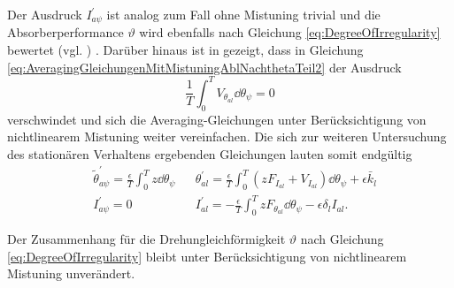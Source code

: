 Der Ausdruck $I_{a \psi}^\prime$ ist analog zum Fall ohne Mistuning trivial und
die Absorberperformance $\vartheta$ wird ebenfalls nach Gleichung \eqref{eq:DegreeOfIrregularity} 
bewertet (vgl. ) \cite{Mayet:CPVAMitMistuning}.
Darüber hinaus ist in %
\cite{Mayet:CPVAMitMistuning}
gezeigt, dass in Gleichung \eqref{eq:AveragingGleichungenMitMistuningAblNachthetaTeil2} der Ausdruck
%
\begin{equation}
	 \frac{1}{T} \int_0^T    V_{\theta_{al}}   \dd \theta_{\psi} = 0		
	\label{eq:TermTildeVwelcherVerschwindet}
\end{equation}
verschwindet und sich die Averaging-Gleichungen unter Berücksichtigung von nichtlinearem Mistuning 
weiter vereinfachen. Die sich zur weiteren Untersuchung 
des stationären Verhaltens  ergebenden Gleichungen lauten somit endgültig
%
%
%
%
\begin{align}
		& \tilde{\theta}_{a \psi}^\prime = \frac{\epsilon}{T} \int_0^T   z \dd \theta_{\psi}  &  
		& \theta_{al}^\prime = \frac{\epsilon}{T} \int_0^T   \left(  z F_{I_{al}} + V_{I_{al}} \right)  \dd \theta_{\psi}        + \epsilon \bar{k}_l  	\label{eq:AveragingGleichungenMitMistuningAblNachthetaTeil1vereinfacht}\\
		& I_{a \psi}^\prime = 0 &
		& I_{al}^\prime = - \frac{\epsilon}{T} \int_0^T  z F_{\theta_{al}}  \dd \theta_{\psi}        - \epsilon \delta_l I_{al} .
	\label{eq:AveragingGleichungenMitMistuningAblNachthetaTeil2vereinfacht}
\end{align}
%
%
%

Der %
Zusammenhang für die Drehungleichförmigkeit $\vartheta$ nach Gleichung	\eqref{eq:DegreeOfIrregularity}  bleibt unter Berücksichtigung von nichtlinearem Mistuning unverändert. 




